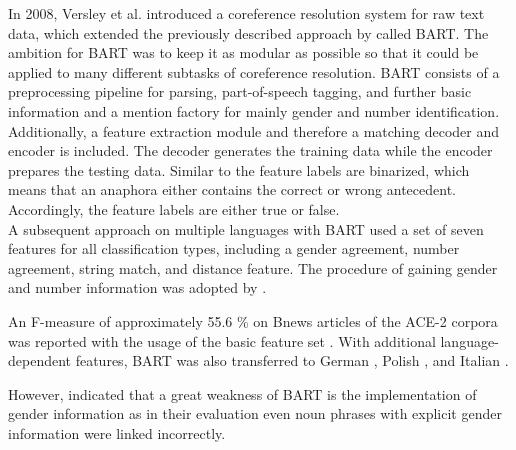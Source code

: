 In 2008, Versley et al. introduced a coreference resolution system for raw text data, which extended the previously described approach by \cite{soon2001machine} called BART. The ambition for BART was to keep it as modular as possible so that it could be applied to many different subtasks of coreference resolution. BART consists of a preprocessing pipeline for parsing, part-of-speech tagging, and further basic information and a mention factory for mainly gender and number identification. Additionally, a feature extraction module and therefore a matching decoder and encoder is included. The decoder generates the training data while the encoder prepares the testing data. Similar to \citep{soon2001machine} the feature labels are binarized, which means that an anaphora either contains the correct or wrong antecedent. Accordingly, the feature labels are either true or false. \\
A subsequent approach on multiple languages with BART \citep{broscheit2010bart} used a set of seven features for all classification types, including a gender agreement, number agreement, string match, and distance feature. The procedure of gaining gender and number information was adopted by \cite{soon2001machine}. 

An F-measure of approximately 55.6 \% on Bnews articles of the ACE-2 corpora was reported with the usage of the basic feature set \citep{versley2008bart}. 
With additional language-dependent features, BART was also transferred to German \citep{broscheit2010extending}, Polish \citep{kopec2012creating}, and Italian \citep{poesio2010creating}.

However, \cite{reiteretal:2011b} indicated that a great weakness of BART is the implementation of gender information as in their evaluation even noun phrases with explicit gender information were linked incorrectly.

